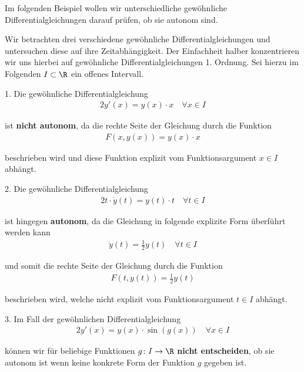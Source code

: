 \documentclass[letterpaper,10pt,english]{jupyterBook}
\begin{document}
\par
Im folgenden Beispiel wollen wir unterschiedliche gewöhnliche Differentialgleichungen darauf prüfen, ob sie autonom sind.
\label{ode/repetition:example-4}
\begin{example}{}{}



\par
Wir betrachten drei verschiedene gewöhnliche Differentialgleichungen und untersuchen diese auf ihre Zeitabhängigkeit.
Der Einfachheit halber konzentrieren wir uns hierbei auf gewöhnliche Differentialgleichungen 1. Ordnung.
Sei hierzu  im Folgenden \(I \subset \R\) ein offenes Intervall.

\par
1. Die gewöhnliche Differentialgleichung
\begin{align*}
2y'(x) = y(x)\cdot x \quad \forall x \in I
\end{align*}
\par
ist \textbf{nicht autonom}, da die rechte Seite der Gleichung durch die Funktion
\begin{align*}
F(x,y(x)) = y(x) \cdot x
\end{align*}
\par
beschrieben wird und diese Funktion explizit vom Funktionsargument \(x \in I\) abhängt.



\par
2. Die gewöhnliche Differentialgleichung
\begin{align*}
2t\cdot \dot{y}(t) = y(t)\cdot t \quad \forall t \in I
\end{align*}
\par
ist hingegen \textbf{autonom}, da die Gleichung in folgende explizite Form überführt werden kann
\begin{align*}
\dot{y}(t) = \frac{1}{2} y(t) \quad \forall t \in I
\end{align*}
\par
und somit die rechte Seite der Gleichung durch die Funktion
\begin{align*}
F(t,y(t)) = \frac{1}{2}y(t)
\end{align*}
\par
beschrieben wird, welche nicht explizit vom Funktionsargument \(t \in I\) abhängt.



\par
3. Im Fall der gewöhnlichen Differentialgleichung
\begin{align*}
2y'(x) = y(x)\cdot \sin(g(x)) \quad \forall x \in I
\end{align*}
\par
können wir für beliebige Funktionen \(g \colon I \rightarrow \R\) \textbf{nicht entscheiden}, ob sie autonom ist wenn keine konkrete Form der Funktion \(g\) gegeben ist.
\end{example}
\end{document}
